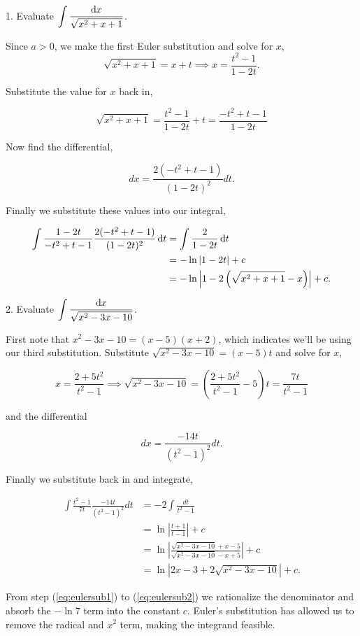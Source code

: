 1. Evaluate $\displaystyle \int \frac{\textrm{d}x}{\sqrt{x^2 + x + 1}}$.

\begin{ExampleBody}
    
    Since $a>0$, we make the first Euler substitution and solve for $x$, $$\sqrt{x^2 + x + 1} = x + t \implies x = \frac{t^2 - 1}{1-2t}.$$
    
    \noindent Substitute the value for $x$ back in,
    
    $$ \sqrt{x^2 + x + 1} = \frac{t^2 - 1}{1-2t} + t = \frac{-t^2+t-1}{1-2t} $$
    
    \noindent Now find the differential,
    
    $$ dx = \frac{2(-t^2+t-1)}{(1-2t)^2} dt. $$
    
    \noindent Finally we substitute these values into our integral,
    
    \begin{align*} 
    \int \frac{1-2t}{-t^2+t-1} \frac{2(-t^2+t-1)}{(1-2t)^2}\,\textrm{d}t &= \int \frac{2}{1-2t}\,\textrm{d}t \\
    &= - \ln \left| 1-2t \right| + c \\
    &= -\ln\left| 1-2\left(\sqrt{x^2+x+1}-x\right)\right| + c.
    \end{align*}
    
\end{ExampleBody}

2. Evaluate $\displaystyle \int \frac{\textrm{d}x}{\sqrt{x^2-3x-10}}$.
\begin{ExampleBody}
    
    First note that $x^2-3x-10 = (x-5)(x+2)$, which indicates we'll be using our third substitution. Substitute $\sqrt{x^2-3x-10} = (x-5)t$ and solve for $x$,
    
    $$ x = \frac{2+5t^2}{t^2-1} \implies \sqrt{x^2-3x-10} = \left(\frac{2+5t^2}{t^2-1}-5\right)t = \frac{7t}{t^2-1} $$
    
    \noindent and the differential
    
    $$ dx = \frac{-14t}{(t^2-1)^2} dt. $$
    
    \noindent Finally we substitute back in and integrate,
    
    \begin{align}
         \int \frac{t^2-1}{7t} \frac{-14t}{(t^2-1)^2}dt &= -2 \int \frac{dt}{t^2-1} \nonumber \\
        &= \ln\left| \frac{t+1}{t-1} \right| +c \nonumber \\ 
        &= \ln\left| \frac{\sqrt{x^2-3x-10} + x - 5}{\sqrt{x^2-3x-10} - x + 5} \right| + c \label{eq:eulersub1} \\
        &= \ln\left| 2x-3+2\sqrt{x^2-3x-10} \right| + c. \label{eq:eulersub2}
    \end{align}
    
    From step (\ref{eq:eulersub1}) to (\ref{eq:eulersub2}) we rationalize the denominator and absorb the $-\ln 7$ term into the constant $c$. Euler's substitution has allowed us to remove  the radical and $x^2$ term, making the integrand feasible. 
\end{ExampleBody}

